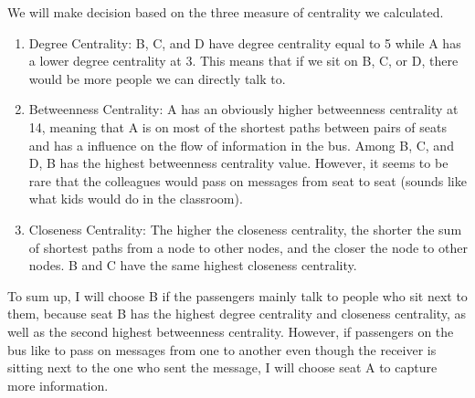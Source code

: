 \documentclass[
]{article}
\providecommand{\tightlist}{%
  \setlength{\itemsep}{0pt}\setlength{\parskip}{0pt}}
\begin{document}
We will make decision based on the three measure of centrality we
calculated.

\begin{enumerate}
\def\labelenumi{\arabic{enumi}.}
\tightlist
\item
  Degree Centrality: B, C, and D have degree centrality equal to 5 while
  A has a lower degree centrality at 3. This means that if we sit on B,
  C, or D, there would be more people we can directly talk to.
\item
  Betweenness Centrality: A has an obviously higher betweenness
  centrality at 14, meaning that A is on most of the shortest paths
  between pairs of seats and has a influence on the flow of information
  in the bus. Among B, C, and D, B has the highest betweenness
  centrality value. However, it seems to be rare that the colleagues
  would pass on messages from seat to seat (sounds like what kids would
  do in the classroom).
\item
  Closeness Centrality: The higher the closeness centrality, the shorter
  the sum of shortest paths from a node to other nodes, and the closer
  the node to other nodes. B and C have the same highest closeness
  centrality.
\end{enumerate}

To sum up, I will choose B if the passengers mainly talk to people who
sit next to them, because seat B has the highest degree centrality and
closeness centrality, as well as the second highest betweenness
centrality. However, if passengers on the bus like to pass on messages
from one to another even though the receiver is sitting next to the one
who sent the message, I will choose seat A to capture more information.
\end{document}
